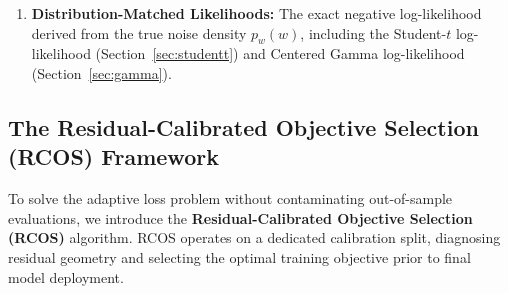 \begin{enumerate}
  \item \textbf{Distribution-Matched Likelihoods:} The exact negative log-likelihood derived from the true noise density $p_w(w)$, including the Student-$t$ log-likelihood (Section~\ref{sec:studentt}) and Centered Gamma log-likelihood (Section~\ref{sec:gamma}).
\end{enumerate}

\subsection{The Residual-Calibrated Objective Selection (RCOS) Framework}
\label{sec:rcos}

To solve the adaptive loss problem without contaminating out-of-sample evaluations, we introduce the \textbf{Residual-Calibrated Objective Selection (RCOS)} algorithm. RCOS operates on a dedicated calibration split, diagnosing residual geometry and selecting the optimal training objective prior to final model deployment.

